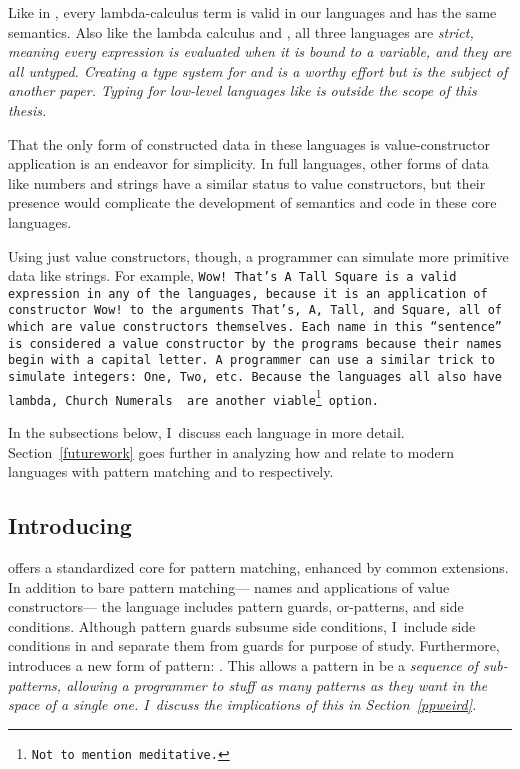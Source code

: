\documentclass[manuscript,screen,review, 12pt, nonacm]{acmart}
\begin{document}
    Like in \VC, every lambda-calculus term is valid in our languages and has
    the same semantics. Also like the lambda calculus and \VC, all three
    languages are \it{strict}, meaning every expression is evaluated when it is
    bound to a variable, and they are all untyped. Creating a type system for
    \PPlus and \VMinus is a worthy effort but is the subject of another paper.
    Typing for low-level languages like \D is outside the scope of this thesis. 
    
    That the only form of constructed data in these languages is
    value-constructor application is an endeavor for simplicity. In full
    languages, other forms of data like numbers and strings have a similar
    status to value constructors, but their presence would complicate the
    development of semantics and code in these core languages. 
    
    Using just value constructors, though, a programmer can simulate more
    primitive data like strings. For example, \tt{Wow! That's A Tall Square} is
    a valid expression in any of the languages, because it is an application of
    constructor \tt{Wow!} to the arguments \tt{That's}, \tt{A}, \tt{Tall}, and
    \tt{Square}, all of which are value constructors themselves. Each name in
    this “sentence” is considered a value constructor by the programs because
    their names begin with a capital letter. A programmer can use a similar
    trick to simulate integers: \tt{One}, \tt{Two}, etc. Because the languages
    all also have lambda, Church Numerals~\citep{church1985calculi} are another
    viable\footnote{Not to mention meditative.} option. 

    In the subsections below, I~discuss each language in more detail.
    Section~\ref{futurework} goes further in analyzing how \PPlus and \VMinus
    relate to modern languages with pattern matching and to \VC respectively. 


\subsection{Introducing \PPlus}
\label{pplus}

    \PPlus offers a standardized core for pattern matching, enhanced by common
    extensions. In addition to bare pattern matching— names and applications of
    value constructors— the language includes pattern guards, or-patterns, and
    side conditions. Although pattern guards subsume side conditions, I~include
    side conditions in \PPlus and separate them from guards for purpose of
    study. Furthermore, \PPlus introduces a new form of pattern: \pcommap. This
    allows a pattern in \PPlus be a \it{sequence} of sub-patterns, allowing a
    programmer to stuff as many patterns as they want in the space of a single
    one. I~discuss the implications of this in Section~\ref{ppweird}.
\end{document}

